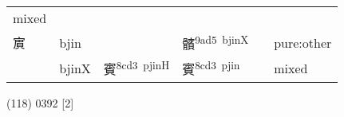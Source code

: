 \documentclass[14pt,a4paper]{scrartcl}
\begin{document}
\begin{longtable}[c]{@{}llllll@{}}
\begin{minipage}[t]{0.14\columnwidth}
mixed
\strut\end{minipage}\tabularnewline
\begin{minipage}[t]{0.14\columnwidth}\raggedright\strut
賔
\strut\end{minipage} &
\begin{minipage}[t]{0.14\columnwidth}\raggedright\strut
bjin
\strut\end{minipage} &
\begin{minipage}[t]{0.14\columnwidth}\raggedright\strut
\strut\end{minipage} &
\begin{minipage}[t]{0.14\columnwidth}\raggedright\strut
髕\textsuperscript{9ad5~bjinX}
\strut\end{minipage} &
\begin{minipage}[t]{0.14\columnwidth}\raggedright\strut
\strut\end{minipage} &
\begin{minipage}[t]{0.14\columnwidth}\raggedright\strut
pure:other
\strut\end{minipage}\tabularnewline
\begin{minipage}[t]{0.14\columnwidth}\raggedright\strut
𡧍
\strut\end{minipage} &
\begin{minipage}[t]{0.14\columnwidth}\raggedright\strut
bjinX
\strut\end{minipage} &
\begin{minipage}[t]{0.14\columnwidth}\raggedright\strut
賓\textsuperscript{8cd3~pjinH}
\strut\end{minipage} &
\begin{minipage}[t]{0.14\columnwidth}\raggedright\strut
賓\textsuperscript{8cd3~pjin}
\strut\end{minipage} &
\begin{minipage}[t]{0.14\columnwidth}\raggedright\strut
\strut\end{minipage} &
\begin{minipage}[t]{0.14\columnwidth}\raggedright\strut
mixed
\strut\end{minipage}\tabularnewline
\bottomrule
\end{longtable}

(118) 0392 {[}2{]}
\end{document}

